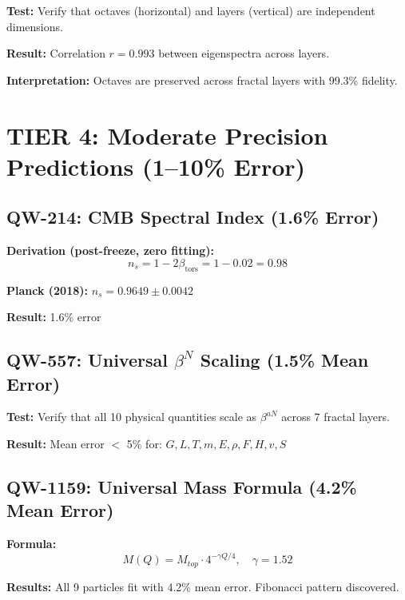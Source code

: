\documentclass[11pt, a4paper]{article}
\theoremstyle{remark}
\newcommand{\betators}{\beta_{\text{tors}}}
\begin{document}
\textbf{Test:} Verify that octaves (horizontal) and layers (vertical) are independent dimensions.

\textbf{Result:} Correlation $r = 0.993$ between eigenspectra across layers.

\textbf{Interpretation:} Octaves are preserved across fractal layers with 99.3\% fidelity.

\section{TIER 4: Moderate Precision Predictions (1--10\% Error)}

\subsection{QW-214: CMB Spectral Index (1.6\% Error)}

\textbf{Derivation (post-freeze, zero fitting):}
\begin{equation}
n_s = 1 - 2\betators = 1 - 0.02 = 0.98
\end{equation}

\textbf{Planck (2018):} $n_s = 0.9649 \pm 0.0042$

\textbf{Result:} 1.6\% error

\subsection{QW-557: Universal $\beta^N$ Scaling (1.5\% Mean Error)}

\textbf{Test:} Verify that all 10 physical quantities scale as $\beta^{aN}$ across 7 fractal layers.

\textbf{Result:} Mean error $<$ 5\% for: $G, L, T, m, E, \rho, F, H, v, S$

\subsection{QW-1159: Universal Mass Formula (4.2\% Mean Error)}

\textbf{Formula:}
\begin{equation}
M(Q) = M_{top} \cdot 4^{-\gamma Q/4}, \quad \gamma = 1.52
\end{equation}

\textbf{Results:} All 9 particles fit with 4.2\% mean error. Fibonacci pattern discovered.
\end{document}
